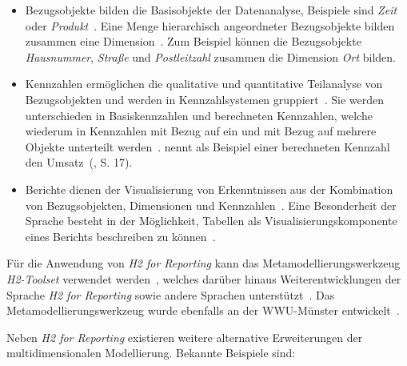 \documentclass[
  language=german, %
  type=bachelor,%
  ngerman
]{isthesis}
\begin{document}
\begin{content}
	\begin{itemize}

		\item Bezugsobjekte bilden die Basisobjekte der Datenanalyse, Beispiele
		sind \textit{Zeit} oder \textit{Produkt}~\cite[][S.  5]{becker2007h2}. Eine
		Menge hierarchisch angeordneter Bezugsobjekte bilden zusammen eine
		Dimension~\cite[][S.  88]{becker2012fachkonzeptionelle}. Zum Beispiel
		können die Bezugsobjekte \textit{Hausnummer}, \textit{Straße} und
		\textit{Postleitzahl} zusammen die Dimension \textit{Ort} bilden.

		\item Kennzahlen ermöglichen die qualitative und quantitative Teilanalyse
		von Bezugsobjekten und werden in Kennzahlsystemen
		gruppiert~\cite[][S.88]{becker2012fachkonzeptionelle}. Sie werden
		unterschieden in Basiskennzahlen und berechneten Kennzahlen, welche
		wiederum in Kennzahlen mit Bezug auf ein und mit Bezug auf mehrere Objekte
		unterteilt werden~\cite[][S.  15]{becker2007h2}.
		\textsc{\citeauthor{becker2007h2}} nennt als Beispiel einer berechneten
		Kennzahl den Umsatz~(\cite{becker2007h2}, S. 17).

    \item Berichte dienen der Visualisierung von Erkenntnissen aus der
      Kombination von Bezugsobjekten, Dimensionen und Kennzahlen~\cite[][S.
      23]{becker2007h2}. Eine Besonderheit der Sprache besteht in der
      Möglichkeit, Tabellen als Visualisierungskomponente eines Berichts
      beschreiben zu können~\cite[][S. 86]{becker2012fachkonzeptionelle}.

	\end{itemize}

	Für die Anwendung von \textit{H2 for Reporting} kann das
	Metamodellierungswerkzeug \textit{H2-Toolset} verwendet werden~\cite[][S.
	33]{fleischer2013konstruktion}, welches darüber hinaus Weiterentwicklungen
	der Sprache \textit{H2 for Reporting} sowie andere Sprachen
	unterstützt~\cite[][S. 86]{becker2012fachkonzeptionelle}. Das
	Metamodellierungswerkzeug wurde ebenfalls an der \acrshort{WWU}-Münster
	entwickelt~\cite[][S.  34]{becker2007h2}.


	Neben \textit{H2 for Reporting} existieren weitere alternative Erweiterungen
	der multidimensionalen Modellierung. Bekannte Beispiele sind:


\end{content}
\end{document}
